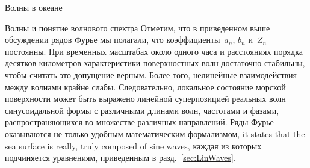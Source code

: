 \begin{chapter}{Волны в океане}
\begin{section}{Волны и понятие волнового спектра}
Отметим, что в приведенном выше обсуждении рядов Фурье мы полагали, что
коэффициенты~$a_n$, $b_n$ и~$Z_n$ постоянны. При временных масштабах около
одного часа и расстояниях порядка десятков километров характеристики 
поверхностных волн достаточно стабильны, чтобы считать это допущение верным.
Более того, нелинейные взаимодействия между волнами крайне слабы. 
Следовательно, локальное состояние морской поверхности может быть выражено
линейной суперпозицией реальных волн синусоидальной формы с различными длинами
волн, частотами и фазами, распространяющихся во множестве различных 
направлений. Ряды Фурье оказываются не только удобным математическим 
формализмом, it states that the sea surface is really, truly composed
of sine waves, каждая из которых подчиняется уравнениям, приведенным в
разд.~\ref{sec:LinWaves}.
%


\end{section}
\end{chapter}
